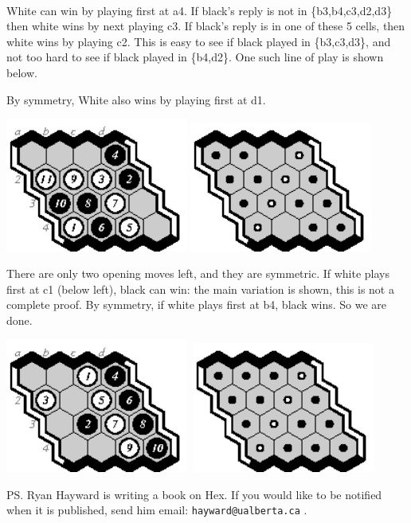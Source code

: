 \documentclass[12pt]{article}
\begin{document}
~

White can win by playing first at a4.
If black's reply is not in \{b3,b4,c3,d2,d3\}
then white wins by next playing c3.
If black's reply is in one of these 5 cells,
then white wins by playing c2.
This is easy to see if black played in \{b3,c3,d3\},
and not too hard to see if black played in \{b4,d2\}.
One such line of play is shown below.

By symmetry, White also wins by playing first at d1.
\vfill

\includegraphics[width=60mm]{fz/pix/4z.eps}
\includegraphics[width=60mm]{fz/pix/4x4.winners2.eps}
\vfill

There are only two opening moves left, and they are symmetric.
If white plays first at c1 (below left), black can win:
the main variation is shown, this is not a complete proof.
By symmetry, if white plays first at b4, black wins.
So we are done.
\vfill

\includegraphics[width=60mm]{fz/pix/4last.eps}\
\includegraphics[width=60mm]{fz/pix/4x4.winners.eps}
\vfill

PS. Ryan Hayward is writing a book on Hex. If you would like
to be notified when it is published, send him email:
\verb+hayward@ualberta.ca+ .

\end{document}
